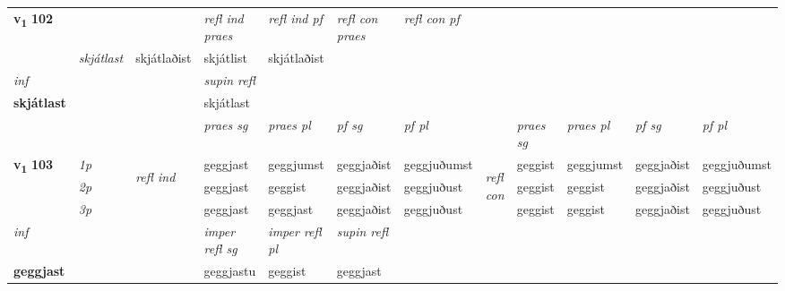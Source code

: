 \begin{longtable}[l]{X>{\footnotesize\itshape}llXXXXlXXXX}
\midrule

\multirow{2}{*}{{{\textbf{v{\textsubscript{1}}} \Large{\textbf{102}}}}}  & &&\textit{refl ind praes} & \textit{refl ind pf} & \textit{refl con praes} & \textit{refl con pf} \\*
\multicolumn{3}{r}{\textit{e-m}}& skjátlast & skjátlaðist & skjátlist & skjátlaðist \\*

\cmidrule{4-7}
   {\textit{inf}} & &       & \textit{supin refl}  \\*
  {\textbf{skjátlast}} & &       & skjátlast  \\*

\midrule

 & &   & \textit{praes sg}  & \textit{praes pl}    & \textit{ pf sg} & \textit{pf pl} & & \textit{praes sg}  & \textit{praes pl}    & \textit{pf sg} & \textit{pf pl }  \\ \cmidrule{4-7} \cmidrule{9-12}
 \multirow{2}{*}{{{\textbf{v{\textsubscript{1}}} \Large{\textbf{103}}}}}  & 1p & \multirow{3}{*}{\begin{turn}{90}\textit{refl ind}\end{turn}}  & geggjast & geggjumst & geggjaðist & geggjuðumst & \multirow{3}{*}{\begin{turn}{90}\textit{refl con}\end{turn}}  &geggist & geggjumst & geggjaðist & geggjuðumst \\*
 & 2p &  & geggjast & geggist & geggjaðist & geggjuðust & &geggist & geggist & geggjaðist & geggjuðust \\*
 & 3p  & & geggjast & geggjast & geggjaðist & geggjuðust & & geggist & geggist& geggjaðist & geggjuðust \\*
\cmidrule{4-7} \cmidrule{9-12}

   {\textit{inf}} & &   & \textit{imper refl sg} & \textit{imper refl pl}   & \textit{supin refl}  \\*
  {\textbf{geggjast}} & &   & geggjastu & geggist   & geggjast  \\*

\midrule


\end{longtable}
